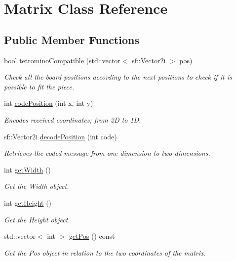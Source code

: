 \hypertarget{classMatrix}{}\section{Matrix Class Reference}
\label{classMatrix}
\subsection*{Public Member Functions}
\begin{DoxyCompactItemize}
\item 
bool \hyperlink{classMatrix_a2f7248b95312e5ecabeab518cd584774}{tetromino\+Compatible} (std\+::vector$<$ sf\+::\+Vector2i $>$ pos)
\begin{DoxyCompactList}\small\item\em Check all the board positions according to the next positions to check if it is possible to fit the piece. \end{DoxyCompactList}\item 
int \hyperlink{classMatrix_ac4c14902c7108f0f9ac46ee9d1ef92f9}{code\+Position} (int x, int y)
\begin{DoxyCompactList}\small\item\em Encodes received coordinates; from 2D to 1D. \end{DoxyCompactList}\item 
sf\+::\+Vector2i \hyperlink{classMatrix_a5680e2198758d4b7524810d0e0fe4021}{decode\+Position} (int code)
\begin{DoxyCompactList}\small\item\em Retrieves the coded message from one dimension to two dimensions. \end{DoxyCompactList}\item 
int \hyperlink{classMatrix_a3f51ba6280305f2d692ab754800297fa}{get\+Width} ()
\begin{DoxyCompactList}\small\item\em Get the Width object. \end{DoxyCompactList}\item 
int \hyperlink{classMatrix_a3af39c453aeb30c5cb55f72c2e71917f}{get\+Height} ()
\begin{DoxyCompactList}\small\item\em Get the Height object. \end{DoxyCompactList}\item 
std\+::vector$<$ int $>$ \hyperlink{classMatrix_a9fa09bc31e6e2dfe4ced74eb34de0f70}{get\+Pos} () const
\begin{DoxyCompactList}\small\item\em Get the Pos object in relation to the two coordinates of the matrix. \end{DoxyCompactList}\item 

\end{DoxyCompactItemize}
